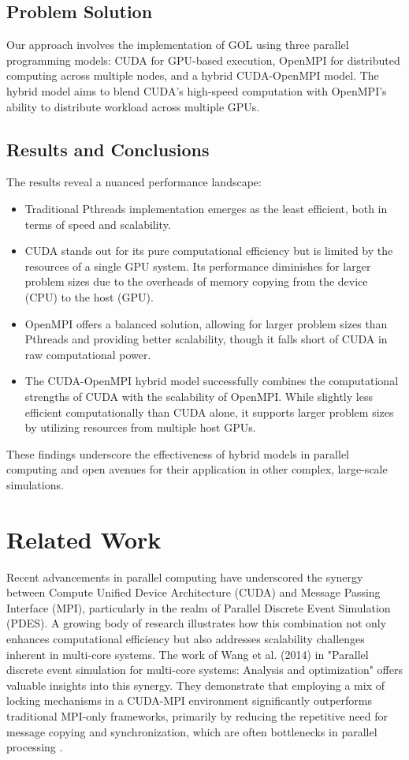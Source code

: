 \documentclass[11pt,twocolumn]{article}
\begin{document}
\subsection*{Problem Solution}
Our approach involves the implementation of GOL using three parallel programming models: CUDA for GPU-based execution, OpenMPI for distributed computing across multiple nodes, and a hybrid CUDA-OpenMPI model. The hybrid model aims to blend CUDA's high-speed computation with OpenMPI's ability to distribute workload across multiple GPUs.

\subsection*{Results and Conclusions}
The results reveal a nuanced performance landscape:

\begin{itemize}
    \item Traditional Pthreads implementation emerges as the least efficient, both in terms of speed and scalability.
    \item CUDA stands out for its pure computational efficiency but is limited by the resources of a single GPU system. Its performance diminishes for larger problem sizes due to the overheads of memory copying from the device (CPU) to the host (GPU).
    \item OpenMPI offers a balanced solution, allowing for larger problem sizes than Pthreads and providing better scalability, though it falls short of CUDA in raw computational power.
    \item The CUDA-OpenMPI hybrid model successfully combines the computational strengths of CUDA with the scalability of OpenMPI. While slightly less efficient computationally than CUDA alone, it supports larger problem sizes by utilizing resources from multiple host GPUs.
\end{itemize}

These findings underscore the effectiveness of hybrid models in parallel computing and open avenues for their application in other complex, large-scale simulations.

\section {Related Work}\label{relwork}

Recent advancements in parallel computing have underscored the synergy between Compute Unified Device Architecture (CUDA) and Message Passing Interface (MPI), particularly in the realm of Parallel Discrete Event Simulation (PDES). A growing body of research illustrates how this combination not only enhances computational efficiency but also addresses scalability challenges inherent in multi-core systems. The work of Wang et al. (2014) in "Parallel discrete event simulation for multi-core systems: Analysis and optimization" offers valuable insights into this synergy. They demonstrate that employing a mix of locking mechanisms in a CUDA-MPI environment significantly outperforms traditional MPI-only frameworks, primarily by reducing the repetitive need for message copying and synchronization, which are often bottlenecks in parallel processing \cite{Wang:PDES}.
\end{document}
